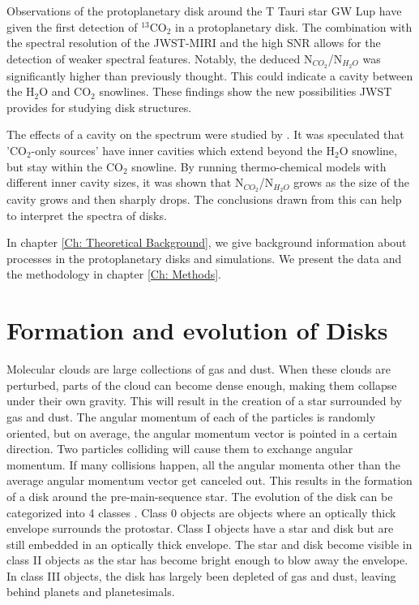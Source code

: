 \documentclass[twoside, single, authoryear, semicolon]{lion-msc}
\newcommand{\4}{$_4$}
\newcommand{\3}{$_3$}
\newcommand{\2}{$_2$}
\begin{document}
Observations of the protoplanetary disk around the T Tauri star GW Lup have given the first detection of $^{13}$CO$_2$ in a protoplanetary disk. \cite{Grant_2023} The combination with the spectral resolution of the JWST-MIRI and the high SNR allows for the detection of weaker spectral features. Notably, the deduced N$_{CO_2}$/N$_{H_2O}$ was significantly higher than previously thought. This could indicate a cavity between the H$_2$O and CO$_2$ snowlines. These findings show the new possibilities JWST provides for studying disk structures. 

The effects of a cavity on the spectrum were studied by \cite{vlasblom2023midinfraredspectrattauri}. It was speculated that 'CO$_2$-only sources' have inner cavities which extend beyond the H$_2$O snowline, but stay within the CO$_2$ snowline. By running thermo-chemical models with different inner cavity sizes, it was shown that N$_{CO_2}$/N$_{H_2O}$ grows as the size of the cavity grows and then sharply drops. The conclusions drawn from this can help to interpret the spectra of disks.

In chapter \ref{Ch: Theoretical Background}, we give background information about processes in the protoplanetary disks and simulations. We present the data and the methodology in chapter \ref{Ch: Methods}.



\section{Formation and evolution of Disks}
Molecular clouds are large collections of gas and dust. When these clouds are perturbed, parts of the cloud can become dense enough, making them collapse under their own gravity. This will result in the creation of a star surrounded by gas and dust. The angular momentum of each of the particles is randomly oriented, but on average, the angular momentum vector is pointed in a certain direction. Two particles colliding will cause them to exchange angular momentum. If many collisions happen, all the angular momenta other than the average angular momentum vector get canceled out. This results in the formation of a disk around the pre-main-sequence star.
The evolution of the disk can be categorized into 4 classes \citep{1987ApJ...312..788A}. Class 0 objects are objects where an optically thick envelope surrounds the protostar. Class I objects have a star and disk but are still embedded in an optically thick envelope. The star and disk become visible in class II objects as the star has become bright enough to blow away the envelope. In class III objects, the disk has largely been depleted of gas and dust, leaving behind planets and planetesimals. 
\end{document}
